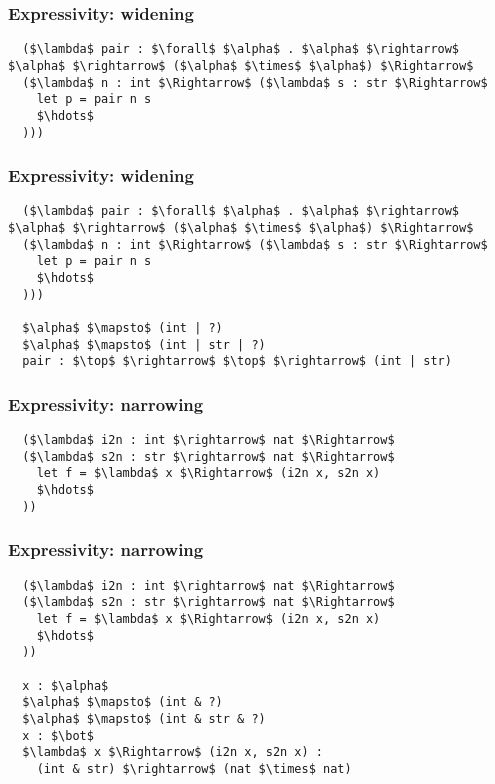 \documentclass{beamer}
\begin{document}
\begin{frame}[fragile]
  \frametitle{Expressivity: widening}

  \begin{lstlisting}
  ($\lambda$ pair : $\forall$ $\alpha$ . $\alpha$ $\rightarrow$ $\alpha$ $\rightarrow$ ($\alpha$ $\times$ $\alpha$) $\Rightarrow$ 
  ($\lambda$ n : int $\Rightarrow$ ($\lambda$ s : str $\Rightarrow$ 
    let p = pair n s
    $\hdots$
  )))

  \end{lstlisting}
\end{frame}


\begin{frame}[fragile]
  \frametitle{Expressivity: widening}

  \begin{lstlisting}
  ($\lambda$ pair : $\forall$ $\alpha$ . $\alpha$ $\rightarrow$ $\alpha$ $\rightarrow$ ($\alpha$ $\times$ $\alpha$) $\Rightarrow$ 
  ($\lambda$ n : int $\Rightarrow$ ($\lambda$ s : str $\Rightarrow$ 
    let p = pair n s
    $\hdots$
  )))

  $\alpha$ $\mapsto$ (int | ?) 
  $\alpha$ $\mapsto$ (int | str | ?)
  pair : $\top$ $\rightarrow$ $\top$ $\rightarrow$ (int | str)  

  \end{lstlisting}
\end{frame}


\begin{frame}[fragile]
  \frametitle{Expressivity: narrowing}

  \begin{lstlisting}
  ($\lambda$ i2n : int $\rightarrow$ nat $\Rightarrow$ 
  ($\lambda$ s2n : str $\rightarrow$ nat $\Rightarrow$ 
    let f = $\lambda$ x $\Rightarrow$ (i2n x, s2n x)
    $\hdots$
  ))
  \end{lstlisting}
\end{frame}

\begin{frame}[fragile]
  \frametitle{Expressivity: narrowing}

  \begin{lstlisting}
  ($\lambda$ i2n : int $\rightarrow$ nat $\Rightarrow$ 
  ($\lambda$ s2n : str $\rightarrow$ nat $\Rightarrow$ 
    let f = $\lambda$ x $\Rightarrow$ (i2n x, s2n x)
    $\hdots$
  ))
  
  x : $\alpha$
  $\alpha$ $\mapsto$ (int & ?)
  $\alpha$ $\mapsto$ (int & str & ?)
  x : $\bot$
  $\lambda$ x $\Rightarrow$ (i2n x, s2n x) : 
    (int & str) $\rightarrow$ (nat $\times$ nat) 
  \end{lstlisting}
\end{frame}
\end{document}
